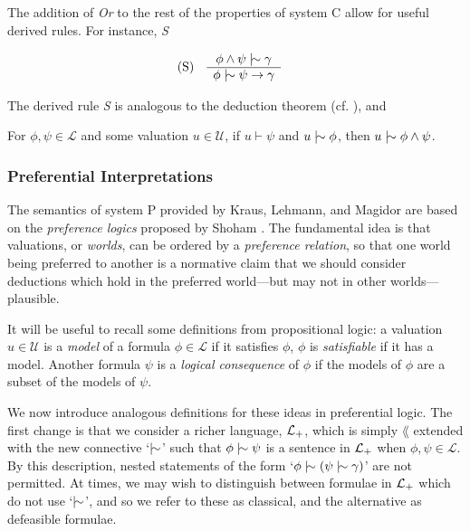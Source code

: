 The addition of \textit{Or} to the rest of the properties of system C allow for useful derived rules. For instance, \textit{S}

\begin{align}
	\inferLeft{S}{\phi \land \psi \twiddle \gamma}{\phi \twiddle \psi \rightarrow \gamma}
\end{align}

The derived rule \textit{S} is analogous to the deduction theorem (cf. ), and

\begin{lemma}
	For $\phi, \psi \in \mathcal{L}$ and some valuation $u \in \mathcal{U}$, if $u \vdash \psi$ and $u \twiddle \phi$, then
	$u \twiddle \phi \land \psi$.
\end{lemma}

\subsubsection{Preferential Interpretations}
\label{subsubsection:preferential-interpretations}

The semantics of system P provided by Kraus, Lehmann, and Magidor \cite{kraus1990nonmonotonic} are based on the \textit{preference
logics} proposed by Shoham \cite{shohamSemanticApproach}. The fundamental idea is that valuations, or \textit{worlds}, can
be ordered by a \textit{preference relation}, so that one world being preferred to another is a normative claim that we should
consider deductions which hold in the preferred world---but may not in other worlds---plausible.

It will be useful to recall some definitions from propositional logic: a valuation $u \in \mathcal{U}$ is a \textit{model}
of a formula $\phi \in \mathcal{L}$ if it satisfies $\phi$, $\phi$ is \textit{satisfiable} if it has a model. Another
formula $\psi$ is a \textit{logical consequence} of $\phi$ if the models of $\phi$ are a subset of the models of $\psi$.

We now introduce analogous definitions for these ideas in preferential logic. The first change is that we consider a
richer language, $\mathcal{L}_+$, which is simply $\lang$ extended with the new connective `$\twiddle$' such that
$\phi \twiddle \psi$ is a sentence in $\mathcal{L}_+$ when $\phi, \psi \in \mathcal{L}$. By this description, nested statements
of the form `$\phi \twiddle (\psi \twiddle \gamma )$' are not permitted. At times, we may wish to distinguish between
formulae in $\mathcal{L}_+$ which do not use `$\twiddle$', and so we refer to these as classical, and the alternative as
defeasible formulae.

